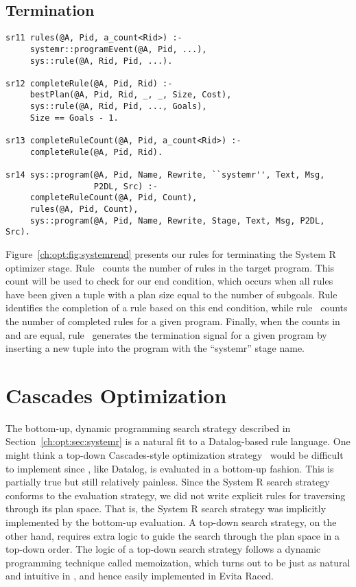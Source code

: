 \subsection{Termination}
\label{ch:opt:sec:termination}

\begin{figure*}
\ssp
\centering
\begin{lstlisting}
sr11 rules(@A, Pid, a_count<Rid>) :-
     systemr::programEvent(@A, Pid, ...),
     sys::rule(@A, Rid, Pid, ...).

sr12 completeRule(@A, Pid, Rid) :-
     bestPlan(@A, Pid, Rid, _, _, Size, Cost),
     sys::rule(@A, Rid, Pid, ..., Goals),
     Size == Goals - 1.

sr13 completeRuleCount(@A, Pid, a_count<Rid>) :-
     completeRule(@A, Pid, Rid).

sr14 sys::program(@A, Pid, Name, Rewrite, ``systemr'', Text, Msg, 
                  P2DL, Src) :-
     completeRuleCount(@A, Pid, Count),
     rules(@A, Pid, Count),
     sys::program(@A, Pid, Name, Rewrite, Stage, Text, Msg, P2DL, Src).
\end{lstlisting}
\caption{\label{ch:opt:fig:systemrend}System R termination rules.}
\end{figure*}

Figure~\ref{ch:opt:fig:systemrend} presents our rules for terminating the
System R optimizer stage.  Rule~ counts the number of rules in the target
program.  This count will be used to check for our end condition, which occurs
when all rules have been given a  tuple with a plan size equal to
the number of subgoals.  Rule~ identifies the completion of a rule based
on this end condition, while rule~ counts the number of completed rules
for a given program.  Finally, when the counts in  and
 are equal, rule~ generates the termination signal for a given
program by inserting a new tuple into the  program with the ``systemr''
stage name.

\section{Cascades Optimization}
\label{ch:opt:sec:cascades}

The bottom-up, dynamic programming search strategy described in
Section~\ref{ch:opt:sec:systemr} is a natural fit to a Datalog-based rule
language.  One might think a top-down Cascades-style optimization
strategy~\cite{cascades} would be difficult to implement since \OVERLOG, like
Datalog, is evaluated in a bottom-up fashion.  This is partially true but still
relatively painless.  Since the System R search strategy conforms to the
\OVERLOG evaluation strategy, we did not write explicit rules for traversing
through its plan space.  That is, the System R search strategy was implicitly
implemented by the \OVERLOG bottom-up evaluation.  A top-down search strategy,
on the other hand, requires extra logic to guide the search through the plan
space in a top-down order.  The logic of a top-down search strategy follows a
dynamic programming technique called memoization, which turns out to be just as
natural and intuitive in \OVERLOG, and hence easily implemented in Evita Raced.

